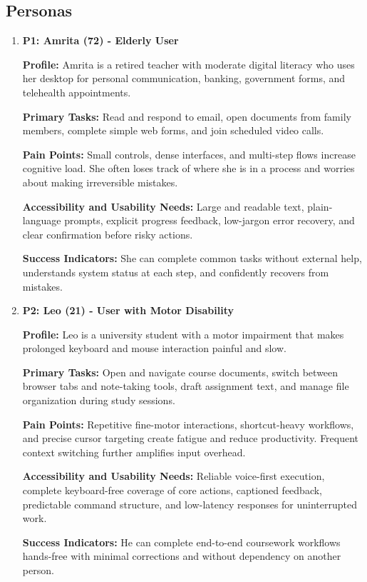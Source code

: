 \documentclass[12pt]{article}
\begin{document}
\subsection{Personas}
\begin{enumerate}
  \item \textbf{P1: Amrita (72) - Elderly User}

  \textbf{Profile:}
  Amrita is a retired teacher with moderate digital literacy who uses
  her desktop for personal communication, banking, government forms,
  and telehealth appointments.

  \textbf{Primary Tasks:}
  Read and respond to email, open documents from family members,
  complete simple web forms, and join scheduled video calls.

  \textbf{Pain Points:}
  Small controls, dense interfaces, and multi-step flows increase
  cognitive load. She often loses track of where she is in a process
  and worries about making irreversible mistakes.

  \textbf{Accessibility and Usability Needs:}
  Large and readable text, plain-language prompts, explicit progress
  feedback, low-jargon error recovery, and clear confirmation before
  risky actions.

  \textbf{Success Indicators:}
  She can complete common tasks without external help, understands
  system status at each step, and confidently recovers from mistakes.

  \item \textbf{P2: Leo (21) - User with Motor Disability}

  \textbf{Profile:}
  Leo is a university student with a motor impairment that makes
  prolonged keyboard and mouse interaction painful and slow.

  \textbf{Primary Tasks:}
  Open and navigate course documents, switch between browser tabs and
  note-taking tools, draft assignment text, and manage file
  organization during study sessions.

  \textbf{Pain Points:}
  Repetitive fine-motor interactions, shortcut-heavy workflows, and
  precise cursor targeting create fatigue and reduce productivity.
  Frequent context switching further amplifies input overhead.

  \textbf{Accessibility and Usability Needs:}
  Reliable voice-first execution, complete keyboard-free coverage of
  core actions, captioned feedback, predictable command structure, and
  low-latency responses for uninterrupted work.

  \textbf{Success Indicators:}
  He can complete end-to-end coursework workflows hands-free with
  minimal corrections and without dependency on another person.


\end{enumerate}
\end{document}
